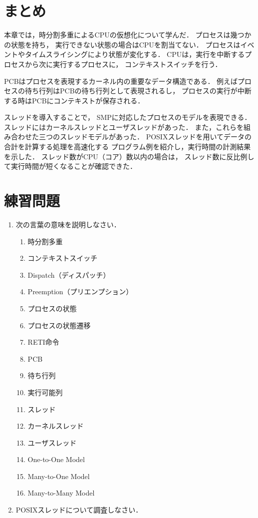 \section{まとめ}
本章では，時分割多重によるCPUの仮想化について学んだ．
プロセスは幾つかの状態を持ち，
実行できない状態の場合はCPUを割当てない．
プロセスはイベントやタイムスライシングにより状態が変化する．
CPUは，実行を中断するプロセスから次に実行するプロセスに，
コンテキストスイッチを行う．

PCBはプロセスを表現するカーネル内の重要なデータ構造である．
例えばプロセスの待ち行列はPCBの待ち行列として表現されるし，
プロセスの実行が中断する時はPCBにコンテキストが保存される．

スレッドを導入することで，
SMPに対応したプロセスのモデルを表現できる．
スレッドにはカーネルスレッドとユーザスレッドがあった．
また，これらを組み合わせた三つのスレッドモデルがあった．
POSIXスレッドを用いてデータの合計を計算する処理を高速化する
プログラム例を紹介し，実行時間の計測結果を示した．
スレッド数がCPU（コア）数以内の場合は，
スレッド数に反比例して実行時間が短くなることが確認できた．

\section*{練習問題}
\begin{enumerate}
  \renewcommand{\labelenumi}{\ttfamily\arabic{chapter}.\arabic{enumi}}
  \setlength{\leftskip}{1em}
\item 次の言葉の意味を説明しなさい．
  \begin{enumerate}
    \item 時分割多重
    \item コンテキストスイッチ
    \item Dispatch（ディスパッチ）
    \item Preemption（プリエンプション）
    \item プロセスの状態
    \item プロセスの状態遷移
    \item RETI命令
    \item PCB
    \item 待ち行列
    \item 実行可能列
    \item スレッド
    \item カーネルスレッド
    \item ユーザスレッド
    \item One-to-One Model
    \item Many-to-One Model
    \item Many-to-Many Model
  \end{enumerate}
\item POSIXスレッドについて調査しなさい．
\end{enumerate}
